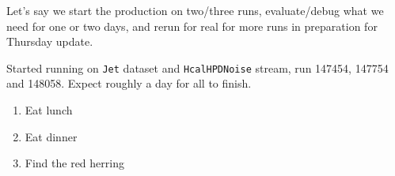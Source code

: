 Let's say we start the production on two/three runs, evaluate/debug what we need for one or two days, and rerun for real for more runs in preparation for Thursday update.

Started running on \texttt{Jet} dataset and \texttt{HcalHPDNoise} stream, run 147454, 147754 and 148058.  Expect roughly a day for all to finish.




\begin{enumerate}
\item Eat lunch
\item Eat dinner
\item Find the red herring
\end{enumerate}


